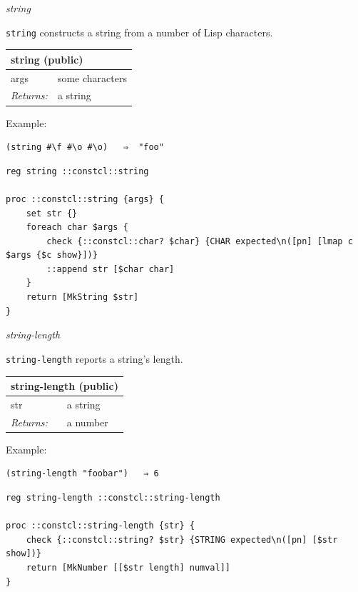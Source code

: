 \documentclass[twoside,9pt]{report}
\begin{document}
\emph{string}


\texttt{string} constructs a string from a number of Lisp characters.

\begin{tabular}{ |l l| }
\hline
\multicolumn{2}{|l|}{string (public)} \\
\hline
args & some characters \\
\textit{Returns:} & a string \\
\hline
\end{tabular}


Example:

\noindent\makebox[\linewidth]{\rule{\linewidth}{0.4pt}}
\begin{lstlisting}
(string #\f #\o #\o)   ⇒  "foo"
\end{lstlisting}
\noindent\makebox[\linewidth]{\rule{\linewidth}{0.4pt}}
\noindent\makebox[\linewidth]{\rule{\linewidth}{0.4pt}}
\begin{lstlisting}
reg string ::constcl::string
 
proc ::constcl::string {args} {
    set str {}
    foreach char $args {
        check {::constcl::char? $char} {CHAR expected\n([pn] [lmap c $args {$c show}])}
        ::append str [$char char]
    }
    return [MkString $str]
}
\end{lstlisting}
\noindent\makebox[\linewidth]{\rule{\linewidth}{0.4pt}}

\emph{string-length}


\texttt{string-length} reports a string's length.

\begin{tabular}{ |l l| }
\hline
\multicolumn{2}{|l|}{string-length (public)} \\
\hline
str & a string \\
\textit{Returns:} & a number \\
\hline
\end{tabular}


Example:

\noindent\makebox[\linewidth]{\rule{\linewidth}{0.4pt}}
\begin{lstlisting}
(string-length "foobar")   ⇒ 6
\end{lstlisting}
\noindent\makebox[\linewidth]{\rule{\linewidth}{0.4pt}}
\noindent\makebox[\linewidth]{\rule{\linewidth}{0.4pt}}
\begin{lstlisting}
reg string-length ::constcl::string-length
 
proc ::constcl::string-length {str} {
    check {::constcl::string? $str} {STRING expected\n([pn] [$str show])}
    return [MkNumber [[$str length] numval]]
}
\end{lstlisting}
\noindent\makebox[\linewidth]{\rule{\linewidth}{0.4pt}}
\end{document}
